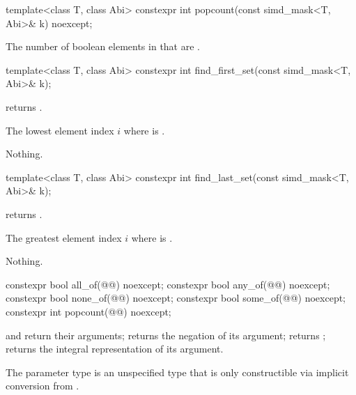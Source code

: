 \begin{itemdecl}
template<class T, class Abi> constexpr int popcount(const simd_mask<T, Abi>& k) noexcept;
\end{itemdecl}

\begin{itemdescr}
  \pnum\returns
  The number of boolean elements in  that are .
\end{itemdescr}

\begin{itemdecl}
template<class T, class Abi> constexpr int find_first_set(const simd_mask<T, Abi>& k);
\end{itemdecl}

\begin{itemdescr}
  \pnum\requires
   returns .

  \pnum\returns
  The lowest element index $i$ where  is .

  \pnum\throws Nothing.
\end{itemdescr}

\begin{itemdecl}
template<class T, class Abi> constexpr int find_last_set(const simd_mask<T, Abi>& k);
\end{itemdecl}

\begin{itemdescr}
  \pnum\requires
   returns .

  \pnum\returns
  The greatest element index $i$ where  is .

  \pnum\throws Nothing.
\end{itemdescr}

\begin{itemdecl}
constexpr bool all_of(@@) noexcept;
constexpr bool any_of(@@) noexcept;
constexpr bool none_of(@@) noexcept;
constexpr bool some_of(@@) noexcept;
constexpr int popcount(@@) noexcept;
\end{itemdecl}

\begin{itemdescr}
  \pnum\returns
   and  return their arguments;  returns the negation of its argument;  returns ;  returns the integral representation of its argument.

  \pnum\remarks
  The parameter type  is an unspecified type that is only constructible via implicit conversion from .
\end{itemdescr}

